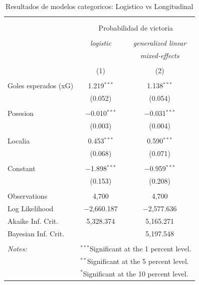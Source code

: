 
\begin{table}[!htbp] \centering 
  \caption{Resultados de modelos categoricos: Logistico vs Longitudinal} 
  \label{} 
\begin{tabular}{@{\extracolsep{5pt}}lcc} 
\\[-1.8ex]\hline 
\hline \\[-1.8ex] 
\\[-1.8ex] & \multicolumn{2}{c}{Probabilidad de victoria} \\ 
\\[-1.8ex] & \textit{logistic} & \textit{generalized linear} \\ 
 & \textit{} & \textit{mixed-effects} \\ 
\\[-1.8ex] & (1) & (2)\\ 
\hline \\[-1.8ex] 
 Goles esperados (xG) & 1.219$^{***}$ & 1.138$^{***}$ \\ 
  & (0.052) & (0.054) \\ 
  & & \\ 
 Posesion & $-$0.010$^{***}$ & $-$0.031$^{***}$ \\ 
  & (0.003) & (0.004) \\ 
  & & \\ 
 Localia & 0.453$^{***}$ & 0.590$^{***}$ \\ 
  & (0.068) & (0.071) \\ 
  & & \\ 
 Constant & $-$1.898$^{***}$ & $-$0.959$^{***}$ \\ 
  & (0.153) & (0.208) \\ 
  & & \\ 
Observations & 4,700 & 4,700 \\ 
Log Likelihood & $-$2,660.187 & $-$2,577.636 \\ 
Akaike Inf. Crit. & 5,328.374 & 5,165.271 \\ 
Bayesian Inf. Crit. &  & 5,197.548 \\ 
\hline \\[-1.8ex] 
\textit{Notes:} & \multicolumn{2}{l}{$^{***}$Significant at the 1 percent level.} \\ 
 & \multicolumn{2}{l}{$^{**}$Significant at the 5 percent level.} \\ 
 & \multicolumn{2}{l}{$^{*}$Significant at the 10 percent level.} \\ 
\end{tabular} 
\end{table} 

